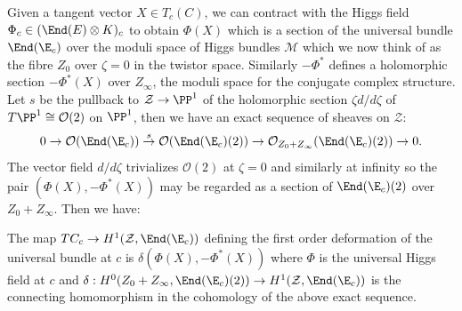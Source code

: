 Given a tangent vector  $X\in T_c(C)$, we can contract with the  Higgs field $\Phi_c\in (\End (E) \otimes K)_c$ to obtain $\Phi(X)$ which is a section of the universal bundle $\End (\E_c)$ over  the moduli space of Higgs bundles  ${\mathcal M}$ which we now think of as the fibre $Z_0$ over $\zeta=0$ in the twistor space. Similarly $-\Phi^*$ defines a holomorphic section $-\Phi^*(X)$ over $Z_{\infty}$, the moduli space  for the conjugate complex structure. Let $s$ be the pullback  to ${\mathcal Z}\rightarrow \PP^1$ of the holomorphic section $\zeta d/d\zeta$ of $T\PP^1\cong {\mathcal O}(2)$ on $\PP^1$, then we have an exact sequence of sheaves on  ${\mathcal Z}$:
$$0\rightarrow {\mathcal O}(\End (\E_c))\stackrel {s} \rightarrow {\mathcal O}(\End (\E_c)(2))\rightarrow {\mathcal O}_{Z_0+Z_{\infty}}(\End (\E_c)(2))\rightarrow 0.$$
The vector field  $d/d\zeta$ trivializes ${\mathcal O}(2)$ at $\zeta=0$ and similarly at infinity so the pair $(\Phi(X),-\Phi^*(X))$ may be regarded as a section of $\End (\E_c)(2)$ over $Z_0+Z_{\infty}$. Then we have:
\begin{proposition}
\notready The map $TC_c\rightarrow H^1({\mathcal Z},\End (\E_c))$ defining the first order deformation of the universal bundle at $c$ is $\delta(\Phi(X),-\Phi^*(X))$ where $\Phi$ is the universal Higgs field at $c$ and  $\delta: H^0({Z_0+Z_{\infty}},\End (\E_c)(2))\rightarrow H^1({\mathcal Z},\End (\E_c))$   is the connecting homomorphism in the cohomology of the above exact sequence.
\end{proposition}
